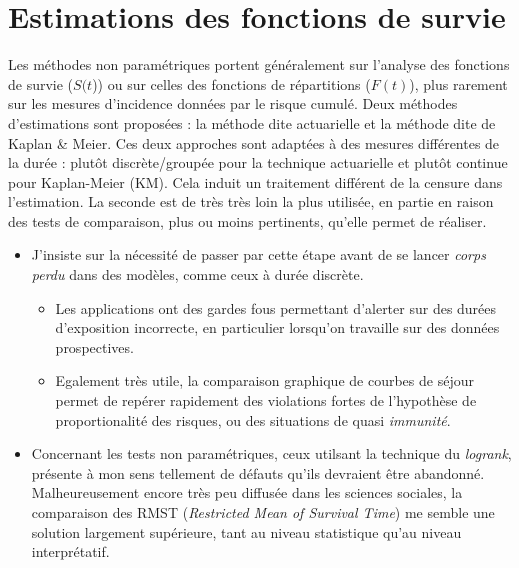 \documentclass[
  12pt,
  letterpaper,
  DIV=11,
  numbers=noendperiod,
  onepage,
  openany]{scrreprt}
\providecommand{\tightlist}{%
  \setlength{\itemsep}{0pt}\setlength{\parskip}{0pt}}\usepackage{longtable,booktabs,array}
\begin{document}
\hypertarget{estimations-des-fonctions-de-survie}{%
\chapter{\texorpdfstring{\textbf{Estimations des fonctions de
survie}}{Estimations des fonctions de survie}}\label{estimations-des-fonctions-de-survie}}

Les méthodes non paramétriques portent généralement sur l'analyse des
fonctions de survie (\(S(t\))) ou sur celles des fonctions de
répartitions (\(F(t)\)), plus rarement sur les mesures d'incidence
données par le risque cumulé. Deux méthodes d'estimations sont proposées
: la méthode dite actuarielle et la méthode dite de Kaplan \& Meier. Ces
deux approches sont adaptées à des mesures différentes de la durée :
plutôt discrète/groupée pour la technique actuarielle et plutôt continue
pour Kaplan-Meier (KM). Cela induit un traitement différent de la
censure dans l'estimation. La seconde est de très très loin la plus
utilisée, en partie en raison des tests de comparaison, plus ou moins
pertinents, qu'elle permet de réaliser.

\begin{tcolorbox}[enhanced jigsaw, arc=.35mm, bottomrule=.15mm, titlerule=0mm, colbacktitle=quarto-callout-important-color!10!white, left=2mm, opacitybacktitle=0.6, toprule=.15mm, title=\textcolor{quarto-callout-important-color}{\faExclamation}\hspace{0.5em}{Important}, colframe=quarto-callout-important-color-frame, breakable, coltitle=black, opacityback=0, toptitle=1mm, bottomtitle=1mm, rightrule=.15mm, leftrule=.75mm, colback=white]

\begin{itemize}
\tightlist
\item
  J'insiste sur la nécessité de passer par cette étape avant de se
  lancer \emph{corps perdu} dans des modèles, comme ceux à durée
  discrète.

  \begin{itemize}
  \tightlist
  \item
    Les applications ont des gardes fous permettant d'alerter sur des
    durées d'exposition incorrecte, en particulier lorsqu'on travaille
    sur des données prospectives.
  \item
    Egalement très utile, la comparaison graphique de courbes de séjour
    permet de repérer rapidement des violations fortes de l'hypothèse de
    proportionalité des risques, ou des situations de quasi
    \emph{immunité}.
  \end{itemize}
\item
  Concernant les tests non paramétriques, ceux utilsant la technique du
  \emph{logrank}, présente à mon sens tellement de défauts qu'ils
  devraient être abandonné. Malheureusement encore très peu diffusée
  dans les sciences sociales, la comparaison des RMST (\emph{Restricted
  Mean of Survival Time}) me semble une solution largement supérieure,
  tant au niveau statistique qu'au niveau interprétatif.
\end{itemize}

\end{tcolorbox}
\end{document}

